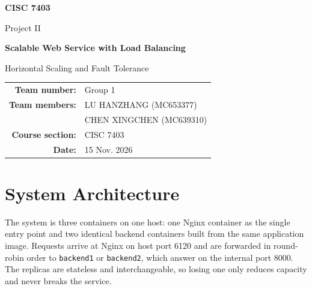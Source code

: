 \documentclass[11pt,a4paper]{article}
\begin{document}
\small

\begin{titlepage}
  \centering
  \vspace*{3cm}
  {\Large\bfseries CISC 7403\par}
  \vspace{0.5cm}
  {\large Project II\par}
  \vspace{2cm}
  {\LARGE\bfseries Scalable Web Service with Load Balancing\par}
  \vspace{0.4cm}
  {\large Horizontal Scaling and Fault Tolerance\par}
  \vspace{2.2cm}
  \begin{tabular}{rl}
    \textbf{Team number:}    & Group 1 \\[3pt]
    \textbf{Team members:}   & LU HANZHANG (MC653377) \\
                             & CHEN XINGCHEN (MC639310) \\[3pt]
    \textbf{Course section:} & CISC 7403 \\[3pt]
    \textbf{Date:}           & 15 Nov. 2026 \\
  \end{tabular}
\end{titlepage}

\section{System Architecture}
The system is three containers on one host: one Nginx container as the single
entry point and two identical backend containers built from the same application
image. Requests arrive at Nginx on host port 6120 and are forwarded in
round-robin order to \texttt{backend1} or \texttt{backend2}, which answer on the
internal port 8000. The replicas are stateless and interchangeable, so losing
one only reduces capacity and never breaks the service.
\end{document}
